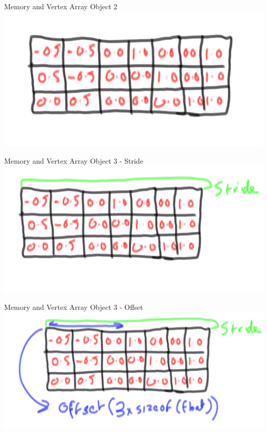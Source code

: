 \begin{frame}{Memory and Vertex Array Object 2}
	\includegraphics[width=1\textwidth]{MemoryLayoutValues}	
\end{frame}

\begin{frame}{Memory and Vertex Array Object 3 - Stride}
	\includegraphics[width=1\textwidth]{MemoryLayoutStride}	
\end{frame}

\begin{frame}{Memory and Vertex Array Object 3 - Offset}
	\includegraphics[width=1\textwidth]{MemoryLayoutOffset}	
\end{frame}